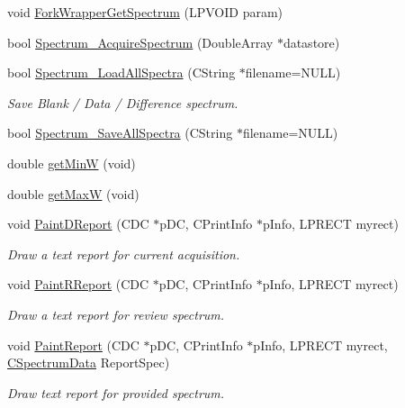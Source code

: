 \begin{DoxyCompactItemize}
\item 
void \hyperlink{classCSpectrometer_a7dbda9c55445b6570fe149d27f705da4}{ForkWrapperGetSpectrum} (LPVOID param)
\item 
bool \hyperlink{classCSpectrometer_a0f998eb992829015c5cbfb578d1b1073}{Spectrum\_\-AcquireSpectrum} (DoubleArray $\ast$datastore)
\item 
bool \hyperlink{classCSpectrometer_accad97a6bf3396d92bf6bb1946eda4e2}{Spectrum\_\-LoadAllSpectra} (CString $\ast$filename=NULL)
\begin{DoxyCompactList}\small\item\em Save Blank / Data / Difference spectrum. \item\end{DoxyCompactList}\item 
bool \hyperlink{classCSpectrometer_a9ba221f05aed4bc47e45bf6b2b82cab8}{Spectrum\_\-SaveAllSpectra} (CString $\ast$filename=NULL)
\item 
double \hyperlink{classCSpectrometer_ae599ab9349878aff8f02718745d355ce}{getMinW} (void)
\item 
double \hyperlink{classCSpectrometer_a1b82cdce185789cb333d233466c1b6ba}{getMaxW} (void)
\item 
void \hyperlink{classCSpectrometer_ab6c2609fecfbb05bc1592e87e7271e7d}{PaintDReport} (CDC $\ast$pDC, CPrintInfo $\ast$pInfo, LPRECT myrect)
\begin{DoxyCompactList}\small\item\em Draw a text report for current acquisition. \item\end{DoxyCompactList}\item 
void \hyperlink{classCSpectrometer_a23e973f1c8f369344c5326109b756ecf}{PaintRReport} (CDC $\ast$pDC, CPrintInfo $\ast$pInfo, LPRECT myrect)
\begin{DoxyCompactList}\small\item\em Draw a text report for review spectrum. \item\end{DoxyCompactList}\item 
void \hyperlink{classCSpectrometer_a057b4b5a32cca4151b8bba3ac4159e57}{PaintReport} (CDC $\ast$pDC, CPrintInfo $\ast$pInfo, LPRECT myrect, \hyperlink{classCSpectrumData}{CSpectrumData} ReportSpec)
\begin{DoxyCompactList}\small\item\em Draw text report for provided spectrum. \item\end{DoxyCompactList}\item 

\end{DoxyCompactItemize}
